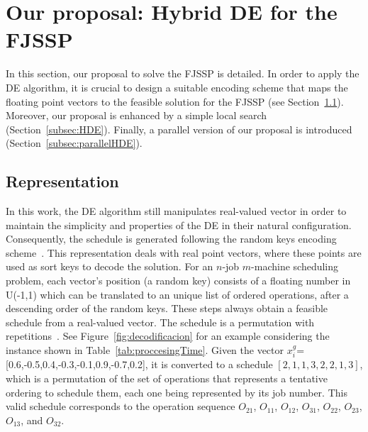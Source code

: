\section{Our proposal: Hybrid DE for the FJSSP}
\label{sec:HDE}
\vspace{-0.2cm}
In this section, our proposal to solve the  FJSSP is detailed. In order to apply the DE algorithm, it is crucial to design a suitable encoding scheme that maps the floating point vectors to the feasible solution for the FJSSP (see Section~\ref{subsec:rep}). Moreover, our proposal is enhanced by a simple local search (Section~\ref{subsec:HDE}). Finally, a parallel version of our proposal is introduced (Section~\ref{subsec:parallelHDE}).


\subsection{Representation}  \label{subsec:rep}
\vspace{-0.25cm}
In this work, the DE algorithm still manipulates real-valued vector in order to maintain the simplicity and properties of the DE in their natural configuration. Consequently, the schedule is generated following the random keys encoding scheme~\cite{Bean1994RepRandomKeys}. This representation deals with real point vectors, where these points are used as sort keys to decode the solution. For an $n$-job $m$-machine scheduling problem, each vector's position (a random key) consists of a floating number in U(-1,1) which can be translated to an unique list of ordered operations, after a descending order of the random keys. These steps always obtain a feasible schedule from a real-valued vector. The schedule is a permutation with repetitions~\cite{bierwirth1995}. See Figure~\ref{fig:decodificacion} for an example considering the instance shown in Table~\ref{tab:proccesingTime}. Given the vector $x_i^g$=[0.6,-0.5,0.4,-0.3,-0.1,0.9,-0.7,0.2], it is converted to a schedule $[2, 1, 1, 3, 2, 2, 1, 3]$, which is a permutation of the set of operations that represents a tentative ordering to schedule them, each one being represented by its job number. This valid schedule corresponds to the operation sequence $O_{21}$, $O_{11}$, $O_{12}$, $O_{31}$, $O_{22}$, $O_{23}$, $O_{13}$, and $O_{32}$. 

